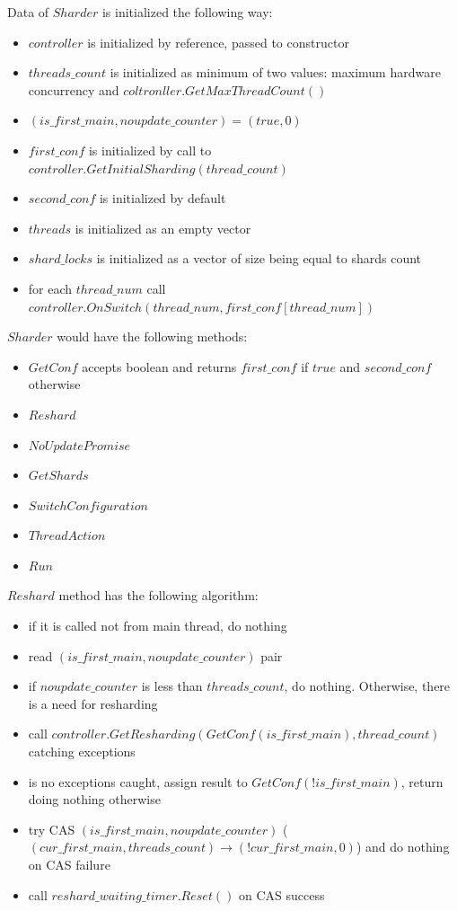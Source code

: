 \documentclass{article}
\begin{document}
Data of $Sharder$ is initialized the following way:
\begin{itemize}
	\item $controller$ is initialized by reference, passed to constructor
	\item $threads\_count$ is initialized as minimum of two values: maximum hardware concurrency and $coltronller.GetMaxThreadCount()$
	\item $(is\_first\_main, noupdate\_counter) = (true, 0)$
	\item $first\_conf$ is initialized by call to $controller.GetInitialSharding(thread\_count)$
	\item $second\_conf$ is initialized by default
	\item $threads$ is initialized as an empty vector
	\item $shard\_locks$ is initialized as a vector of size being equal to shards count
	\item for each $thread\_num$ call $controller.OnSwitch(thread\_num, first\_conf[thread\_num])$
\end{itemize}

$Sharder$ would have the following methods:
\begin{itemize}
	\item $GetConf$ accepts boolean and returns $first\_conf$ if $true$ and $second\_conf$ otherwise
	\item $Reshard$
	\item $NoUpdatePromise$
	\item $GetShards$
	\item $SwitchConfiguration$
	\item $ThreadAction$
	\item $Run$
\end{itemize}

$Reshard$ method has the following algorithm:
\begin{itemize}
	\item if it is called not from main thread, do nothing
	\item read $(is\_first\_main, noupdate\_counter)$ pair
	\item if $noupdate\_counter$ is less than $threads\_count$, do nothing. Otherwise, there is a need for resharding
	\item call $controller.GetResharding(GetConf(is\_first\_main), thread\_count)$ catching exceptions
	\item is no exceptions caught, assign result to $GetConf(!is\_first\_main)$, return doing nothing otherwise
	\item try CAS $(is\_first\_main, noupdate\_counter)$ ($(cur\_first\_main, threads\_count) \rightarrow (!cur\_first\_main, 0)$) and do nothing on CAS failure
	\item call $reshard\_waiting\_timer.Reset()$ on CAS success
\end{itemize}
\end{document}
